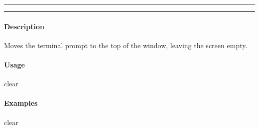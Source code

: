 \hrule
\vspace{1mm}
\hrule
\vspace{4mm}

\paragraph{Description}
\indentpar \raggedright \textrm{Moves the terminal prompt to the top of the window, leaving the screen empty.}\\

\paragraph{Usage}
\indentpar clear \textit{}

\paragraph{Examples}

\indentpar clear

\vspace{20mm}
